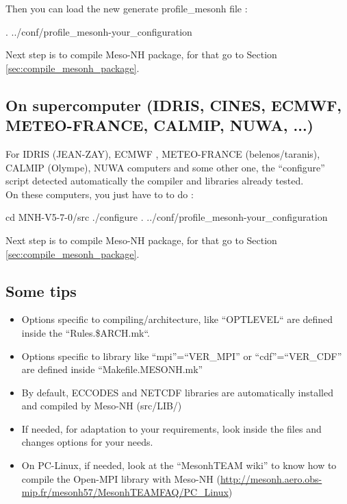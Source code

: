 Then you can load the new generate profile\_mesonh file :
\begin{bashcode}
. ../conf/profile_mesonh-your_configuration
\end{bashcode}

Next step is to compile Meso-NH package, for that go to Section \ref{sec:compile_mesonh_package}.

\subsection{On supercomputer (IDRIS, CINES, ECMWF, METEO-FRANCE, CALMIP, NUWA, ...)}

For IDRIS (JEAN-ZAY), ECMWF , METEO-FRANCE (belenos/taranis), CALMIP (Olympe), NUWA computers and some other one, the ``configure'' script detected automatically the compiler and libraries already tested. \\

On these computers, you just have to to do :
\begin{bashcode}
 cd MNH-V5-7-0/src
 ./configure
 . ../conf/profile_mesonh-your_configuration
 \end{bashcode}

Next step is to compile Meso-NH package, for that go to Section \ref{sec:compile_mesonh_package}.
 
\subsection{Some tips}

\begin{itemize}
\item Options specific to compiling/architecture, like ``OPTLEVEL`` are defined inside the ``Rules.\${ARCH}.mk``.
\item Options specific to library like ``mpi''=``VER\_MPI'' or ``cdf''=``VER\_CDF'' are defined inside ``Makefile.MESONH.mk''
\item By default, ECCODES and NETCDF libraries are automatically installed and compiled by Meso-NH (src/LIB/)
\item If needed, for adaptation to your requirements, look inside the files and changes options for your needs.
\item On PC-Linux, if needed, look at the ``MesonhTEAM wiki'' to know how to compile the Open-MPI library with Meso-NH (\href{http://mesonh.aero.obs-mip.fr/mesonh57/MesonhTEAMFAQ/PC_Linux}{http://mesonh.aero.obs-mip.fr/mesonh57/MesonhTEAMFAQ/PC\_Linux})
 \end{itemize}

 